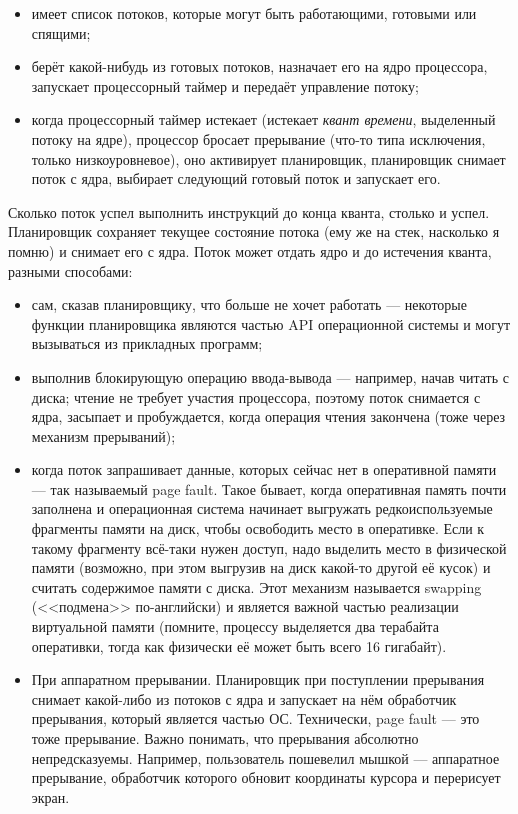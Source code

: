 \documentclass[a5paper]{article}
\begin{document}
\begin{itemize}
    \item имеет список потоков, которые могут быть работающими, готовыми или спящими;
    \item берёт какой-нибудь из готовых потоков, назначает его на ядро процессора, запускает процессорный таймер и передаёт управление потоку;
    \item когда процессорный таймер истекает (истекает \textit{квант времени}, выделенный потоку на ядре), процессор бросает прерывание (что-то типа исключения, только низкоуровневое), оно активирует планировщик, планировщик снимает поток с ядра, выбирает следующий готовый поток и запускает его.
\end{itemize}

Сколько поток успел выполнить инструкций до конца кванта, столько и успел. Планировщик сохраняет текущее состояние потока (ему же на стек, насколько я помню) и снимает его с ядра. Поток может отдать ядро и до истечения кванта, разными способами:

\begin{itemize}
    \item сам, сказав планировщику, что больше не хочет работать --- некоторые функции планировщика являются частью API операционной системы и могут вызываться из прикладных программ;
    \item выполнив блокирующую операцию ввода-вывода --- например, начав читать с диска; чтение не требует участия процессора, поэтому поток снимается с ядра, засыпает и пробуждается, когда операция чтения закончена (тоже через механизм прерываний);
    \item когда поток запрашивает данные, которых сейчас нет в оперативной памяти --- так называемый page fault. Такое бывает, когда оперативная память почти заполнена и операционная система начинает выгружать редкоиспользуемые фрагменты памяти на диск, чтобы освободить место в оперативке. Если к такому фрагменту всё-таки нужен доступ, надо выделить место в физической памяти (возможно, при этом выгрузив на диск какой-то другой её кусок) и считать содержимое памяти с диска. Этот механизм называется swapping (<<подмена>> по-английски) и является важной частью реализации виртуальной памяти (помните, процессу выделяется два терабайта оперативки, тогда как физически её может быть всего 16 гигабайт).
    \item При аппаратном прерывании. Планировщик при поступлении прерывания снимает какой-либо из потоков с ядра и запускает на нём обработчик прерывания, который является частью ОС. Технически, page fault --- это тоже прерывание. Важно понимать, что прерывания абсолютно непредсказуемы. Например, пользователь пошевелил мышкой --- аппаратное прерывание, обработчик которого обновит координаты курсора и перерисует экран.
\end{itemize}
\end{document}
